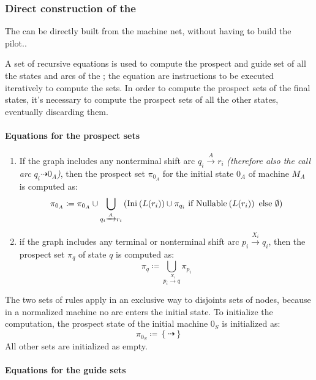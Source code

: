 \documentclass[english]{article}
\begin{document}
\subsubsection{Direct construction of the \PCFG}
\label{sec:direct-contruction-pcfg}

The \PCFG can be directly built from the machine net, without having to build the \elro pilot..

A set of recursive equations is used to compute the prospect and guide set of all the states and arcs of the \PCFG;
the equation are instructions to be executed iteratively to compute the sets.
In order to compute the prospect sets of the final states, it's necessary to compute the prospect sets of all the other states, eventually discarding them.

\paragraph*{Equations for the prospect sets}

\begin{enumerate}
  \item If the graph includes any nonterminal shift arc \(q_i \xrightarrow{A} r_i\)\textit{ (therefore also the call arc \(q_i \dashrightarrow 0_A\))}, then the prospect set \(\pi_{0_A}\) for the initial state \(0_A\) of machine \(M_A\) is computed as:
        \[ \pi_{0_A} \coloneqq \pi_{0_A} \cup \bigcup_{q_i \xrightarrow{A} r_i} \left(  \text{Ini}\hspace{0.1ex} \left( L(r_i) \right) \cup \pi_{q_i} \ \text{if} \ \text{Nullable}\hspace{0.1ex} \left( L(r_i) \right) \ \text{else} \ \emptyset \right) \]
  \item if the graph includes any terminal or nonterminal shift arc \(p_i \xrightarrow{X_i} q_i\), then the prospect set \(\pi_q\) of state \(q\) is computed as:
        \[ \pi_q \coloneqq \bigcup_{p_i \xrightarrow{X_i} q} \pi_{p_i} \]
\end{enumerate}

The two sets of rules apply in an exclusive way to disjoints sets of nodes, because in a normalized machine no arc enters the initial state. To initialize the computation, the prospect state of the initial machine \(0_S\) is initialized as:
\[ \pi_{0_S} \coloneqq \left\{ \dashrightarrow \right\} \]
All other sets are initialized as empty.

\paragraph*{Equations for the guide sets}
\end{document}
